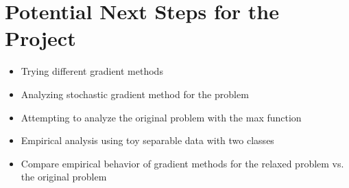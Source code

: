 \documentclass[11pt]{article}
\begin{document}
\section{Potential Next Steps for the Project}

\begin{itemize}
  \item Trying different gradient methods
  \item Analyzing stochastic gradient method for the problem
  \item Attempting to analyze the original problem with the max function
  \item Empirical analysis using toy separable data with two classes
  \item Compare empirical behavior of gradient methods for the relaxed problem vs. the original problem
\end{itemize}

\printbibliography
\end{document}
